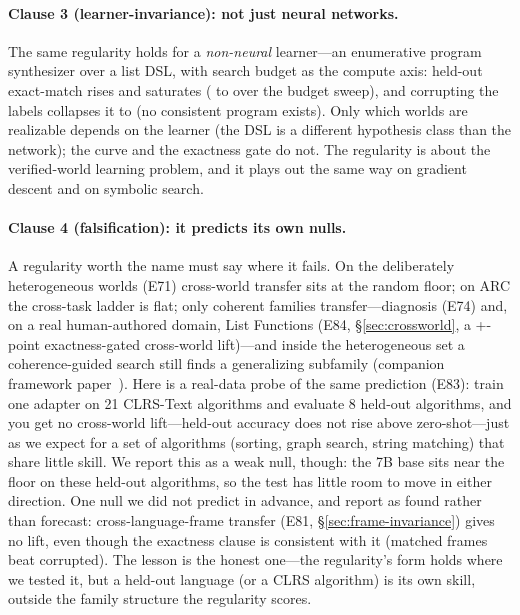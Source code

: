 \documentclass[11pt]{article}
\begin{document}
\paragraph{Clause 3 (learner-invariance): not just neural networks.} The same regularity holds for a
\emph{non-neural} learner---an enumerative program synthesizer over a list DSL, with search
budget as the compute axis: held-out exact-match rises and saturates (\SymScaleLo{} to
\SymScaleHi{} over the budget sweep), and corrupting the labels collapses it to \SymCorrupt{}
(no consistent program exists). Only which worlds are realizable depends on the learner (the
DSL is a different hypothesis class than the network); the curve and the exactness gate do not.
The regularity is about the verified-world learning problem, and it plays out the same way on gradient
descent and on symbolic search.

\paragraph{Clause 4 (falsification): it predicts its own nulls.} A regularity worth the name must say where it
fails. On the \ComboNWorlds{} deliberately heterogeneous worlds (E71) cross-world
transfer sits at the random floor; on ARC the cross-task ladder is flat; only coherent families
transfer---diagnosis (E74) and, on a real human-authored domain, List Functions
(E84, \S\ref{sec:crossworld}, a \mbox{+\CrossWorldGap}-point exactness-gated cross-world
lift)---and inside the heterogeneous set a coherence-guided search still
finds a generalizing subfamily (companion framework paper~\cite{openworld_framework}).
Here is a real-data probe of the same prediction (E83): train one adapter on 21 CLRS-Text algorithms
and evaluate 8 held-out algorithms, and you get no cross-world lift---held-out accuracy does
not rise above zero-shot---just as we expect for a set of algorithms (sorting, graph search,
string matching) that share little skill. We report this as a weak null, though: the
7B base sits near the floor on these held-out algorithms, so the test has little room to move in
either direction. One null we did not
predict in advance, and report as found rather than forecast: cross-language-frame transfer (E81,
\S\ref{sec:frame-invariance}) gives no lift, even though the exactness clause is consistent
with it (matched frames beat corrupted). The lesson is the honest one---the regularity's form
holds where we tested it, but a held-out language (or a CLRS algorithm) is its own skill,
outside the family structure the regularity scores.
\end{document}
